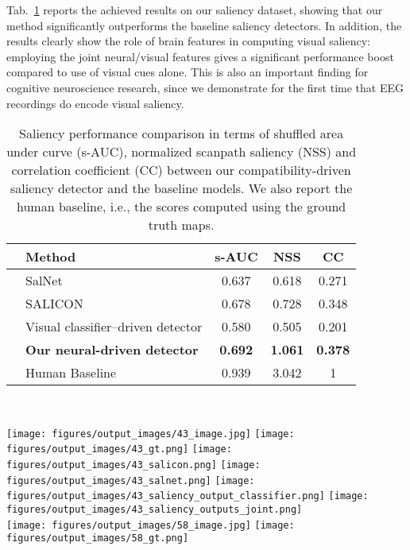 \documentclass[10pt,journal,compsoc,twocolumn]{IEEEtran}
\begin{document}
Tab.~\ref{tab:saliency} reports the achieved results on our saliency dataset, showing that our method significantly outperforms the baseline saliency detectors. In addition, the results clearly show
the role of brain features in computing visual saliency: employing the joint neural/visual features gives a significant performance boost compared to use of visual cues alone. 
This is also an important finding for cognitive neuroscience research, since we demonstrate for the first time that EEG recordings do encode visual saliency.

\begin{table}\small
	\centering
	\begin{tabular}{clccc}
		\toprule
		& \textbf{Method} & \textbf{s-AUC} & \textbf{NSS} &  \textbf{CC} \\
		\midrule
		& SalNet    & 0.637	&	0.618	& 0.271 \\
		& SALICON 	& 0.678	& 	0.728	& 0.348\\
		& Visual classifier--driven detector& 0.580	& 0.505 &	0.201\\
		& \textbf{Our neural-driven detector} & \textbf{0.692}	& \textbf{1.061} & 
		\textbf{0.378}\\
		\midrule
		& Human Baseline    & 0.939&	3.042	&1 \\
		\bottomrule
	\end{tabular}\\
	\caption{Saliency performance comparison in terms of shuffled area under curve (s-AUC), normalized scanpath saliency (NSS) and correlation coefficient (CC) between our compatibility-driven saliency detector and the baseline models. We also report the human baseline, i.e., the scores computed using the ground truth maps.}	\label{tab:saliency}
\end{table}\begin{figure*}
\centering
\texttt{[image: figures/output\_images/43\_image.jpg]}
\texttt{[image: figures/output\_images/43\_gt.png]}
\texttt{[image: figures/output\_images/43\_salicon.png]}
\texttt{[image: figures/output\_images/43\_salnet.png]}
\texttt{[image: figures/output\_images/43\_saliency\_output\_classifier.png]}
\texttt{[image: figures/output\_images/43\_saliency\_outputs\_joint.png]}
\vspace{0.5em}\\
\texttt{[image: figures/output\_images/58\_image.jpg]}
\texttt{[image: figures/output\_images/58\_gt.png]}

\end{figure*}
\end{document}
